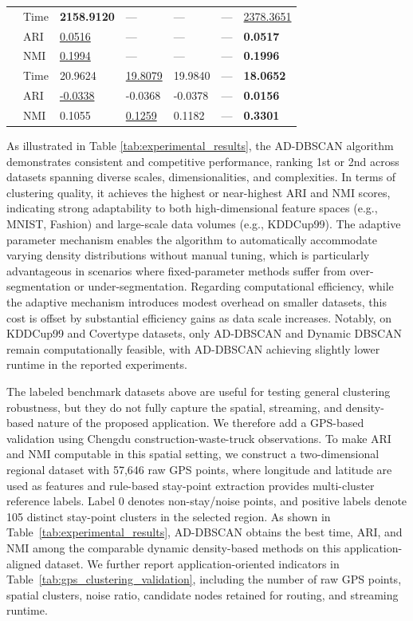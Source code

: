 \documentclass[preprint,12pt,authoryear]{elsarticle}
\theoremstyle{definition}
\begin{document}
\begin{table}[H]
\begin{tabularx}{\textwidth}{llXXXXX}
\addlinespace 
\multirow{3}{*}{\textbf{Covertype}} & Time & \textbf{2158.9120} & --- & --- & --- & \underline{2378.3651} \\ 
& ARI & \underline{0.0516} & --- & --- & --- & \textbf{0.0517} \\ 
& NMI & \underline{0.1994} & --- & --- & --- & \textbf{0.1996} \\ 
\addlinespace
\multirow{3}{*}{\textbf{Chengdu GPS}} & Time & 20.9624 & \underline{19.8079} & 19.9840 & --- & \textbf{18.0652} \\
& ARI & \underline{-0.0338} & -0.0368 & -0.0378 & --- & \textbf{0.0156} \\
& NMI & 0.1055 & \underline{0.1259} & 0.1182 & --- & \textbf{0.3301} \\
\bottomrule 
\end{tabularx}
\end{table}

As illustrated in Table \ref{tab:experimental_results}, the AD-DBSCAN algorithm demonstrates consistent and competitive performance, ranking 1st or 2nd across datasets spanning diverse scales, dimensionalities, and complexities. In terms of clustering quality, it achieves the highest or near-highest ARI and NMI scores, indicating strong adaptability to both high-dimensional feature spaces (e.g., MNIST, Fashion) and large-scale data volumes (e.g., KDDCup99). The adaptive parameter mechanism enables the algorithm to automatically accommodate varying density distributions without manual tuning, which is particularly advantageous in scenarios where fixed-parameter methods suffer from over-segmentation or under-segmentation.
Regarding computational efficiency, while the adaptive mechanism introduces modest overhead on smaller datasets, this cost is offset by substantial efficiency gains as data scale increases. Notably, on KDDCup99 and Covertype datasets, only AD-DBSCAN and Dynamic DBSCAN remain computationally feasible, with AD-DBSCAN achieving slightly lower runtime in the reported experiments.

The labeled benchmark datasets above are useful for testing general clustering robustness, but they do not fully capture the spatial, streaming, and density-based nature of the proposed application. We therefore add a GPS-based validation using Chengdu construction-waste-truck observations. To make ARI and NMI computable in this spatial setting, we construct a two-dimensional regional dataset with 57,646 raw GPS points, where longitude and latitude are used as features and rule-based stay-point extraction provides multi-cluster reference labels. Label 0 denotes non-stay/noise points, and positive labels denote 105 distinct stay-point clusters in the selected region. As shown in Table~\ref{tab:experimental_results}, AD-DBSCAN obtains the best time, ARI, and NMI among the comparable dynamic density-based methods on this application-aligned dataset. We further report application-oriented indicators in Table~\ref{tab:gps_clustering_validation}, including the number of raw GPS points, spatial clusters, noise ratio, candidate nodes retained for routing, and streaming runtime.
\end{document}
